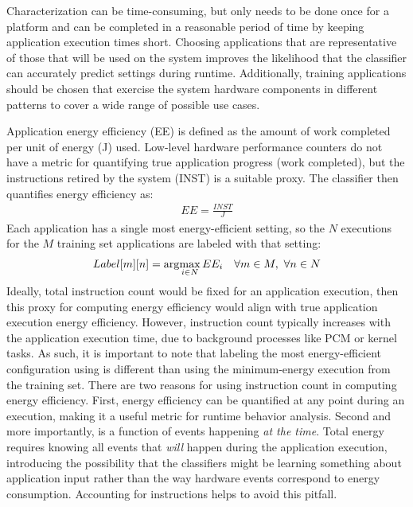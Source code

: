 Characterization can be time-consuming, but only needs to be done once for a platform and can be completed in a reasonable period of time by keeping application execution times short.
Choosing applications that are representative of those that will be used on the system improves the likelihood that the classifier can accurately predict settings during runtime.
Additionally, training applications should be chosen that exercise the system hardware components in different patterns to cover a wide range of possible use cases.

Application energy efficiency (EE) is defined as the amount of work completed per unit of energy (J) used.
Low-level hardware performance counters do not have a metric for quantifying true application progress (work completed), but the instructions retired by the system (INST) is a suitable proxy.
The classifier then quantifies energy efficiency as:
\begin{eqnarray}
EE = \frac{INST}{J}
\label{eqn:ee}
\end{eqnarray}
Each application has a single most energy-efficient setting, so the $N$ executions for the $M$ training set applications are labeled with that setting:
\begin{eqnarray}
Label[m][n] = \arg\!\max_{i \in N}EE_i \,\,\,\,\,\,\forall m \in M,\,\,\forall n \in N
\label{eqn:label}
\end{eqnarray}
Ideally, total instruction count would be fixed for an application execution, then this proxy for computing energy efficiency would align with true application execution energy efficiency.
However, instruction count typically increases with the application execution time, \eg due to background processes like PCM or kernel tasks.
As such, it is important to note that labeling the most energy-efficient configuration using  is different than using the minimum-energy execution from the training set.
There are two reasons for using instruction count in computing energy efficiency.
First, energy efficiency can be quantified at any point during an execution, making it a useful metric for runtime behavior analysis.
Second and more importantly,  is a function of events happening \emph{at the time}.
Total energy requires knowing all events that \emph{will} happen during the application execution, introducing the possibility that the classifiers might be learning something about application input rather than the way hardware events correspond to energy consumption.
Accounting for instructions helps to avoid this pitfall.



